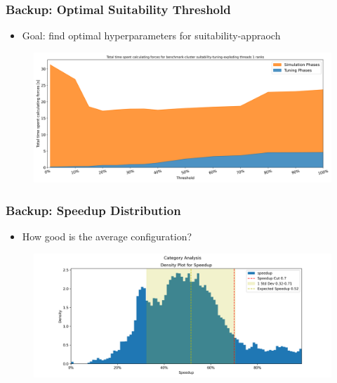 \documentclass[
	10pt,
	t		%
]{beamer}
\begin{document}
\begin{frame}
	\frametitle{Backup: Optimal Suitability Threshold}
	
	\begin{itemize}
		\item Goal: find optimal hyperparameters for suitability-appraoch
	\end{itemize}
	
	\begin{figure}
		\centering
		\includegraphics[width=1\textwidth]{figures/suitability-search.png}
	\end{figure}
\end{frame}



\begin{frame}
	\frametitle{Backup: Speedup Distribution}
	
	\begin{itemize}
		\item How good is the average configuration?
	\end{itemize}
	
	\begin{figure}
		\centering
		\includegraphics[width=1\textwidth]{figures/speedup.png}
	\end{figure}
\end{frame}
\end{document}
